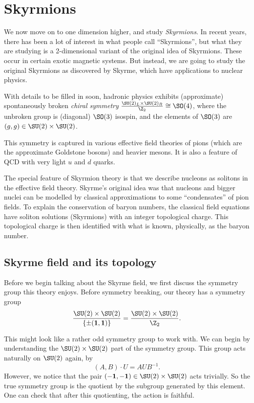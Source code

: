 \documentclass[a4paper]{article}
\begin{document}
\section{Skyrmions}

We now move on to one dimension higher, and study \emph{Skyrmions}. In recent years, there has been a lot of interest in what people call ``Skyrmions'', but what they are studying is a 2-dimensional variant of the original idea of Skyrmions. These occur in certain exotic magnetic systems. But instead, we are going to study the original Skyrmions as discovered by Skyrme, which have applications to nuclear physics.

With details to be filled in soon, hadronic physics exhibits (approximate) spontaneously broken \emph{chiral symmetry} $\frac{\SU(2)_L \times \SU(2)_R}{\Z_2} \cong \SO(4)$, where the unbroken group is (diagonal) $\SO(3)$ isospin, and the elements of $\SO(3)$ are $(g, g) \in \SU(2) \times \SU(2)$.

This symmetry is captured in various effective field theories of pions (which are the approximate Goldstone bosons) and heavier mesons. It is also a feature of QCD with very light $u$ and $d$ quarks.

The special feature of Skyrmion theory is that we describe nucleons as solitons in the effective field theory. Skyrme's original idea was that nucleons and bigger nuclei can be modelled by classical approximations to some ``condensates'' of pion fields. To explain the conservation of baryon numbers, the classical field equations have soliton solutions (Skyrmions) with an integer topological charge. This topological charge is then identified with what is known, physically, as the baryon number.

\subsection{Skyrme field and its topology}
Before we begin talking about the Skyrme field, we first discuss the symmetry group this theory enjoys. Before symmetry breaking, our theory has a symmetry group
\[
  \frac{\SU(2) \times \SU(2)}{\{\pm (\mathbf{1}, \mathbf{1})\}} = \frac{\SU(2) \times \SU(2)}{\Z_2}.
\]

This might look like a rather odd symmetry group to work with. We can begin by understanding the $\SU(2) \times \SU(2)$ part of the symmetry group. This group acts naturally on $\SU(2)$ again, by
\[
  (A, B) \cdot U = AUB^{-1}.
\]
However, we notice that the pair $(-\mathbf{1}, -\mathbf{1}) \in \SU(2) \times \SU(2)$ acts trivially. So the true symmetry group is the quotient by the subgroup generated by this element. One can check that after this quotienting, the action is faithful.
\end{document}
